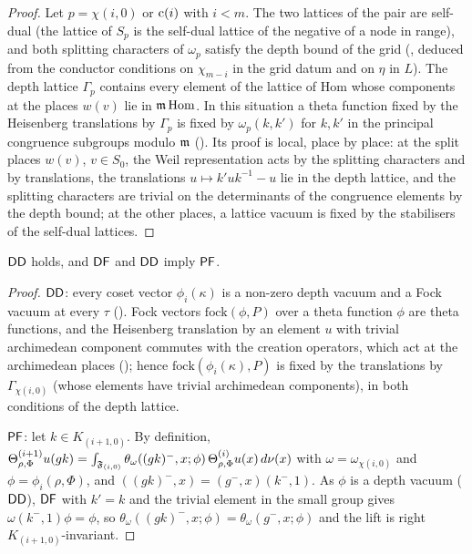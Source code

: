 \begin{proof}
Let $p=\chi(i,0)$ or $\mathrm{c}(i)$ with $i<m$. The two lattices of the pair are self-dual (the lattice of $S_p$ is the self-dual lattice of
the negative of a node in range), and both splitting characters of $\omega_p$ satisfy the depth bound of the grid
(, deduced from the conductor conditions on $\chi_{m-i}$ in the grid datum and on $\eta$
in $L$). The depth lattice $\Gamma_p$ contains every element of the lattice of $\mathrm{Hom}$ whose components at the places $w(v)$ lie in
$\mathfrak m\,\mathrm{Hom}$. In this situation a theta function fixed by the Heisenberg translations by $\Gamma_p$ is fixed by $\omega_p(k,k')$ for
$k,k'$ in the principal congruence subgroups modulo $\mathfrak m$ (). Its proof is local, place by
place: at the split places $w(v)$, $v\in S_0$, the Weil representation acts by the splitting characters and by translations, the
translations $u\mapsto k'uk^{-1}-u$ lie in the depth lattice, and the splitting characters are trivial on the determinants of the
congruence elements by the depth bound; at the other places, a lattice vacuum is fixed by the stabilisers of the self-dual
lattices.
\end{proof}

\begin{proposition}\label{pf:fs:partFixed}
$\mathsf{DD}$ holds, and $\mathsf{DF}$ and $\mathsf{DD}$ imply $\mathsf{PF}$.
\end{proposition}

\begin{proof}
$\mathsf{DD}$: every coset vector $\phi_i(\kappa)$ is a non-zero depth vacuum and a Fock vacuum at every $\tau$
(). Fock vectors $\mathrm{fock}(\phi,P)$ over a theta function $\phi$ are
theta functions, and the Heisenberg translation by an element $u$ with trivial archimedean component commutes with the creation
operators, which act at the archimedean places (); hence
$\mathrm{fock}(\phi_i(\kappa),P)$ is fixed by the translations by $\Gamma_{\chi(i,0)}$ (whose elements have trivial archimedean components),
in both conditions of the depth lattice.

$\mathsf{PF}$: let $k\in K_{(i+1,0)}$. By definition,
$\Theta^{(i+1)}_{\rho,\Phi}u(gk)=\int_{\mathfrak F_{(i,0)}}\theta_{\omega}((gk)^-,x;\phi)\,\Theta^{(i)}_{\rho,\Phi}u(x)\,d\nu(x)$ with $\omega=\omega_{\chi(i,0)}$ and
$\phi=\phi_i(\rho,\Phi)$, and $((gk)^-,x)=(g^-,x)(k^-,1)$. As $\phi$ is a depth vacuum ($\mathsf{DD}$), $\mathsf{DF}$ with $k'=k$ and the trivial
element in the small group gives $\omega(k^-,1)\phi=\phi$, so $\theta_\omega((gk)^-,x;\phi)=\theta_\omega(g^-,x;\phi)$ and the lift is
right $K_{(i+1,0)}$-invariant.
\end{proof}

